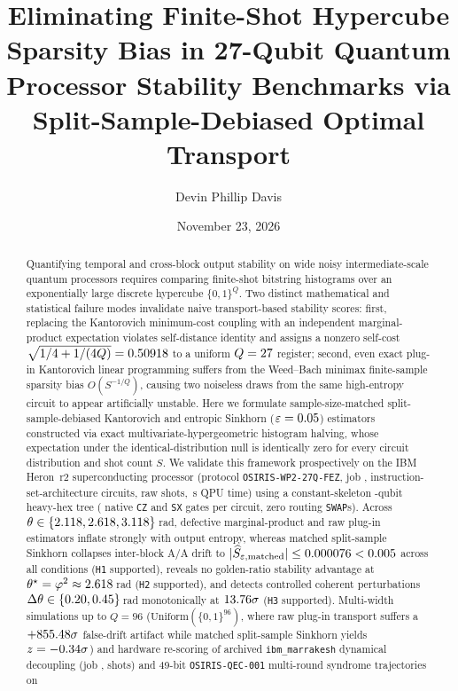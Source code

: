 \documentclass[aps,prapplied,reprint,longbibliography]{revtex4-2}
\begin{document}
\title{Eliminating Finite-Shot Hypercube Sparsity Bias in 27-Qubit Quantum Processor Stability Benchmarks via Split-Sample-Debiased Optimal Transport}

\author{Devin Phillip Davis}

\date{November 23, 2026}

\begin{abstract}
Quantifying temporal and cross-block output stability on wide noisy intermediate-scale quantum processors requires comparing finite-shot bitstring histograms over an exponentially large discrete hypercube $\{0,1\}^Q$. Two distinct mathematical and statistical failure modes invalidate naive transport-based stability scores: first, replacing the Kantorovich minimum-cost coupling with an independent marginal-product expectation violates self-distance identity and assigns a nonzero self-cost $\sqrt{1/4 + 1/(4Q)} = 0.50918{}$ to a uniform $Q=27{}$ register; second, even exact plug-in Kantorovich linear programming suffers from the Weed--Bach minimax finite-sample sparsity bias $O(S^{-1/Q})$, causing two noiseless draws from the same high-entropy circuit to appear artificially unstable. Here we formulate sample-size-matched split-sample-debiased Kantorovich and entropic Sinkhorn ($\varepsilon=0.05{}$) estimators constructed via exact multivariate-hypergeometric histogram halving, whose expectation under the identical-distribution null is identically zero for every circuit distribution and shot count $S$. We validate this framework prospectively on the IBM Heron~r2 superconducting processor \texttt{\WpFezBackend{}} (protocol \texttt{OSIRIS-WP2-27Q-FEZ}, job \texttt{\WpFezJobId{}}, \WpFezTotalPubs{} instruction-set-architecture circuits, \WpFezTotalShots{} raw shots, \WpFezQpuSeconds{}\,s QPU time) using a constant-skeleton \WpFezQubits{}-qubit heavy-hex tree (\WpFezCzCount{} native \texttt{CZ} and \WpFezSxCount{} \texttt{SX} gates per circuit, zero routing \texttt{SWAP}s). Across $\theta \in \{2.118{}, 2.618{}, 3.118{}\}$\,rad, defective marginal-product and raw plug-in estimators inflate strongly with output entropy, whereas matched split-sample Sinkhorn collapses inter-block A/A drift to $|\widehat{S}_{\varepsilon,\mathrm{matched}}| \le 0.000076{} < 0.005{}$ across all conditions (\texttt{H1} supported), reveals no golden-ratio stability advantage at $\theta^\star = \varphi^2 \approx 2.618{}$\,rad (\texttt{H2} supported), and detects controlled coherent perturbations $\Delta\theta \in \{0.20{}, 0.45{}\}$\,rad monotonically at $13.76{}\sigma$ (\texttt{H3} supported). Multi-width simulations up to $Q=96$ ($\mathrm{Uniform}(\{0,1\}^{96})$, where raw plug-in transport suffers a $+855.48{}\sigma$ false-drift artifact while matched split-sample Sinkhorn yields $z=-0.34{}\sigma$) and hardware re-scoring of archived \texttt{ibm\_marrakesh} dynamical decoupling (job \texttt{\WpMarrJobId{}}, \WpMarrTotalShots{} shots) and 49-bit \texttt{OSIRIS-QEC-001} multi-round syndrome trajectories on 
\end{abstract}
\end{document}
